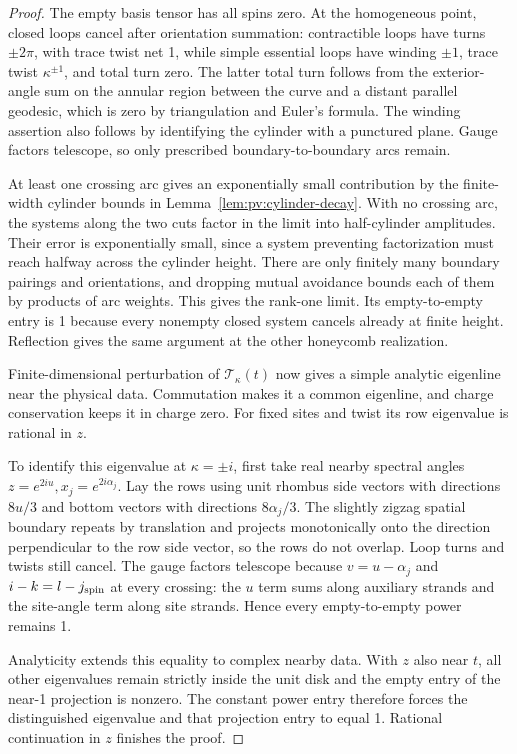 \begin{proof}
The empty basis tensor has all spins zero. At the homogeneous point,
closed loops cancel after orientation summation: contractible loops
have turns \(\pm2\pi\), with trace twist net 1, while simple essential
loops have winding \(\pm1\), trace twist \(\kappa^{\pm1}\), and total
turn zero. The latter total turn follows from the exterior-angle sum
on the annular region between the curve and a distant parallel geodesic,
which is zero by triangulation and Euler's formula. The winding assertion
also follows by identifying the cylinder with a punctured plane. Gauge
factors telescope, so only prescribed boundary-to-boundary arcs remain.

At least one crossing arc gives an exponentially small contribution
by the finite-width cylinder bounds in Lemma~\ref{lem:pv:cylinder-decay}.
With no crossing arc,
the systems along the two cuts factor in the limit into half-cylinder
amplitudes. Their error is exponentially small, since a system preventing
factorization must reach halfway across the cylinder height. There are
only finitely many boundary pairings and orientations, and dropping
mutual avoidance bounds each of them by products of arc weights. This
gives the rank-one limit. Its empty-to-empty entry is 1 because every
nonempty closed system cancels already at finite height. Reflection
gives the same argument at the other honeycomb realization.

Finite-dimensional perturbation of \(\mathcal T_\kappa(t)\) now gives
a simple analytic eigenline near the physical data. Commutation makes
it a common eigenline, and charge conservation keeps it in charge zero.
For fixed sites and twist its row eigenvalue is rational in \(z\).

To identify this eigenvalue at \(\kappa=\pm i\), first take real nearby
spectral angles \(z=e^{2iu},x_j=e^{2i\alpha_j}\). Lay the rows using
unit rhombus side vectors with directions \(8u/3\) and bottom vectors
with directions \(8\alpha_j/3\). The slightly zigzag spatial boundary
repeats by translation and projects monotonically onto the direction
perpendicular to the row side vector, so the rows do not overlap.
Loop turns and twists still cancel. The gauge factors telescope because
\(v=u-\alpha_j\) and \(i-k=l-j_{\rm spin}\) at every crossing: the
\(u\) term sums along auxiliary strands and the site-angle term along
site strands. Hence every empty-to-empty power remains 1.

Analyticity extends this equality to complex nearby data. With \(z\)
also near \(t\), all other eigenvalues remain strictly inside the unit
disk and the empty entry of the near-1 projection is nonzero. The
constant power entry therefore forces the distinguished eigenvalue
and that projection entry to equal 1. Rational continuation in \(z\)
finishes the proof.
\end{proof}
